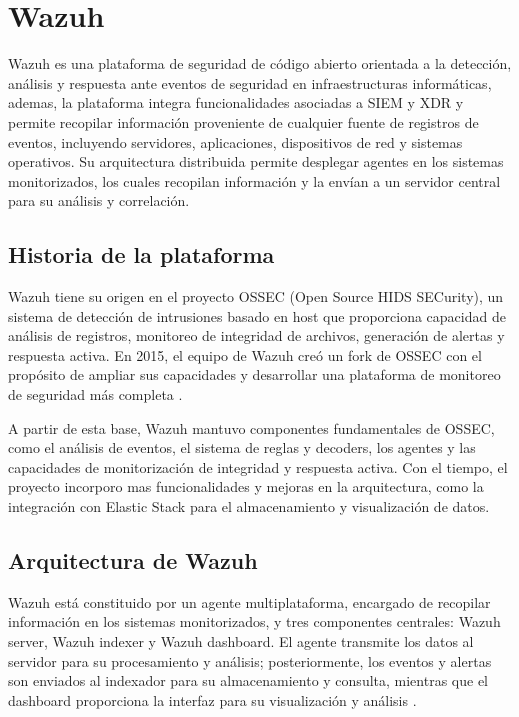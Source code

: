 \section{Wazuh}
Wazuh es una plataforma de seguridad de código abierto orientada a la detección, análisis y respuesta ante eventos de seguridad en infraestructuras informáticas, ademas, la plataforma integra funcionalidades asociadas a SIEM y XDR y permite recopilar información proveniente de cualquier fuente de registros de eventos, incluyendo servidores, aplicaciones, dispositivos de red y sistemas operativos. Su arquitectura distribuida permite desplegar agentes en los sistemas monitorizados, los cuales recopilan información y la envían a un servidor central para su análisis y correlación.

\subsection{Historia de la plataforma}
Wazuh tiene su origen en el proyecto OSSEC (Open Source HIDS SECurity), un sistema de detección de intrusiones basado en host que proporciona capacidad de análisis de registros, monitoreo de integridad de archivos, generación de alertas y respuesta activa. En 2015, el equipo de Wazuh creó un fork de OSSEC con el propósito de ampliar sus capacidades y desarrollar una plataforma de monitoreo de seguridad más completa \cite{wazuh_migrating_ossec}.

A partir de esta base, Wazuh mantuvo componentes fundamentales de OSSEC, como el análisis de eventos, el sistema de reglas y decoders, los agentes y las capacidades de monitorización de integridad y respuesta activa. Con el tiempo, el proyecto incorporo mas funcionalidades y mejoras en la arquitectura, como la integración con Elastic Stack para el almacenamiento y visualización de datos.

\subsection{Arquitectura de Wazuh}
Wazuh está constituido por un agente multiplataforma, encargado de recopilar información en los sistemas monitorizados, y tres componentes centrales: Wazuh server, Wazuh indexer y Wazuh dashboard. El agente transmite los datos al servidor para su procesamiento y análisis; posteriormente, los eventos y alertas son enviados al indexador para su almacenamiento y consulta, mientras que el dashboard proporciona la interfaz para su visualización y análisis \cite{wazuh_components}.

